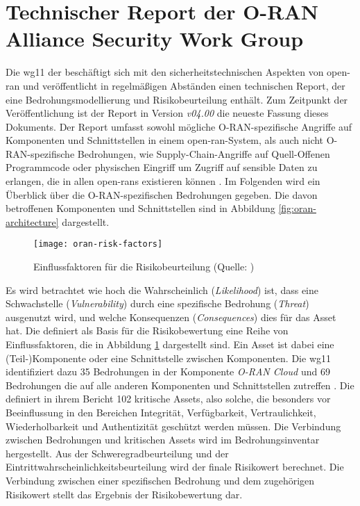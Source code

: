 \section{Technischer Report der O-RAN Alliance Security Work Group}
\label{sec:forschungsstand-wg11}
Die \gls{wg11} der \orana{} beschäftigt sich mit den sicherheitstechnischen Aspekten von \gls{open-ran} und veröffentlicht in regelmäßigen Abständen einen technischen Report, der eine Bedrohungsmodellierung und Risikobeurteilung enthält. Zum Zeitpunkt der Veröffentlichung ist der Report in Version \textit{\textsf{v04.00}} die neueste Fassung dieses Dokuments. Der Report umfasst sowohl mögliche O-RAN-spezifische Angriffe auf Komponenten und Schnittstellen in einem \gls{open-ran}-System, als auch nicht O-RAN-spezifische Bedrohungen, wie Supply-Chain-Angriffe auf Quell-Offenen Programmcode oder physischen Eingriff um Zugriff auf sensible Daten zu erlangen, die in allen \glspl{open-ran} existieren können \autocite{o-ranworkgroup11securityworkgroupORANSecurityThreat2024}. Im Folgenden wird ein Überblick über die O-RAN-spezifischen Bedrohungen gegeben. Die davon betroffenen Komponenten und Schnittstellen sind in Abbildung \ref{fig:oran-architecture} dargestellt.
\begin{figure}
    \centering
    \texttt{[image: oran-risk-factors]}
    \caption{Einflussfaktoren für die Risikobeurteilung (Quelle: \autocite{o-ranworkgroup11securityworkgroupORANSecurityThreat2024})}
    \label{fig:oran-risk-factors}
\end{figure}
\par Es wird betrachtet wie hoch die Wahrscheinlich (\textit{Likelihood}) ist, dass eine Schwachstelle (\textit{Vulnerability}) durch eine spezifische Bedrohung (\textit{Threat}) ausgenutzt wird, und welche Konsequenzen (\textit{Consequences}) dies für das Asset hat. Die \orana{} definiert als Basis für die Risikobewertung eine Reihe von Einflussfaktoren, die in Abbildung \ref{fig:oran-risk-factors} dargestellt sind. Ein Asset ist dabei eine (Teil-)Komponente oder eine Schnittstelle zwischen Komponenten. Die \gls{wg11} identifiziert dazu 35 Bedrohungen in der Komponente \textit{O-RAN Cloud} und 69 Bedrohungen die auf alle anderen Komponenten und Schnittstellen zutreffen \autocite{o-ranworkgroup11securityworkgroupORANSecurityThreat2024}. Die \orana{} definiert in ihrem Bericht 102 kritische Assets, also solche, die besonders vor Beeinflussung in den Bereichen Integrität, Verfügbarkeit, Vertraulichkeit, Wiederholbarkeit und Authentizität geschützt werden müssen. Die Verbindung zwischen Bedrohungen und kritischen Assets wird im Bedrohungsinventar hergestellt. Aus der Schweregradbeurteilung und der Eintrittwahrscheinlichkeitsbeurteilung wird der finale Risikowert berechnet. Die Verbindung zwischen einer spezifischen Bedrohung und dem zugehörigen Risikowert stellt das Ergebnis der Risikobewertung dar.
